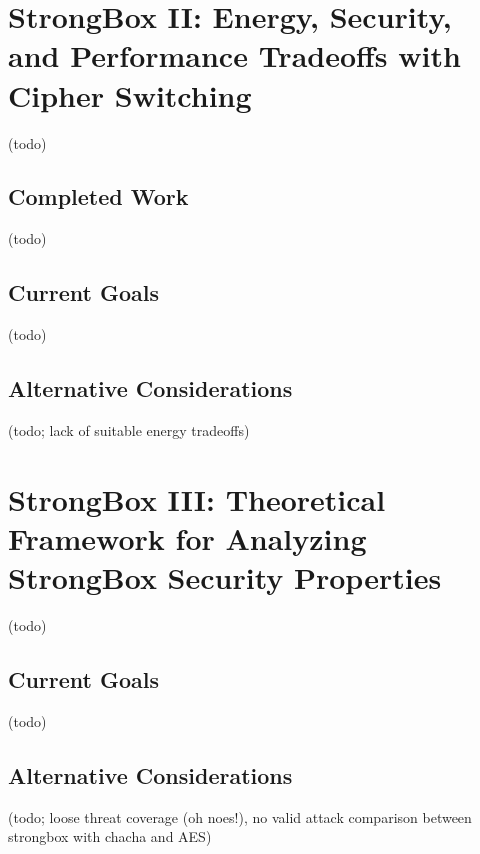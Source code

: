 \section{StrongBox II: Energy, Security, and Performance Tradeoffs with Cipher Switching}

(todo)

\subsection{Completed Work}

(todo)

\subsection{Current Goals}

(todo)

\subsection{Alternative Considerations}

(todo; lack of suitable energy tradeoffs)

\section{StrongBox III: Theoretical Framework for Analyzing StrongBox Security Properties}

(todo)

\subsection{Current Goals}

(todo)

\subsection{Alternative Considerations}

(todo; loose threat coverage (oh noes!), no valid attack comparison between
strongbox with chacha and AES)
